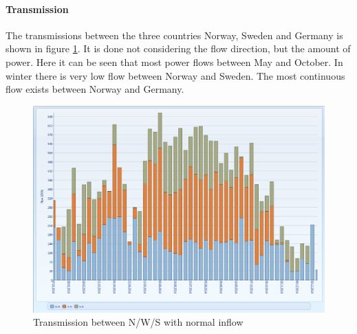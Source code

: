 \documentclass{article}
\begin{document}
\paragraph{Transmission\\}
The transmissions between the three countries Norway, Sweden and Germany is shown in figure \ref{fig:MTnodetransmissionnormal}. It is done not considering the flow direction, but the amount of power. Here it can be seen that most power flows between May and October. In winter there is very low flow between Norway and Sweden. The most continuous flow exists between Norway and Germany.
\begin{figure}[htbp]
\begin{center}
\includegraphics[width=13cm,keepaspectratio=true]{figures/MTnodetransmission}
\caption{Transmission between N/W/S with normal inflow}
\label{fig:MTnodetransmissionnormal}
\end{center}
\end{figure}
\end{document}
